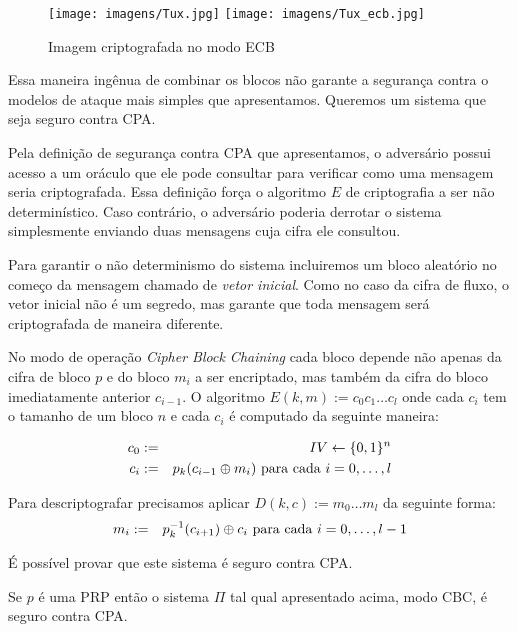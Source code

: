 \begin{figure}[!htp]
  \label{fig:ecb-exemplo}
  \centering
  \texttt{[image: imagens/Tux.jpg]}
  \texttt{[image: imagens/Tux\_ecb.jpg]}
  \caption{Imagem criptografada no modo ECB}
\end{figure}

Essa maneira ingênua de combinar os blocos não garante a segurança contra o modelos de ataque mais simples que apresentamos.
Queremos um sistema que seja seguro contra CPA.

Pela definição de segurança contra CPA que apresentamos, o adversário possui acesso a um oráculo que ele pode consultar para verificar como uma mensagem seria criptografada.
Essa definição força o algoritmo $E$ de criptografia a ser não determinístico.
Caso contrário, o adversário poderia derrotar o sistema simplesmente enviando duas mensagens cuja cifra ele consultou.

Para garantir o não determinismo do sistema incluiremos um bloco aleatório no começo da mensagem chamado de {\em vetor inicial}.
Como no caso da cifra de fluxo, o vetor inicial não é um segredo, mas garante que toda mensagem será criptografada de maneira diferente.

No modo de operação {\em Cipher Block Chaining} cada bloco depende não apenas da cifra de bloco $p$ e do bloco $m_i$ a ser encriptado, mas também da cifra do bloco imediatamente anterior $c_{i-1}$.
O algoritmo $E(k,m) := c_0 c_1 \dots c_l$ onde cada $c_i$ tem o tamanho de um bloco $n$ e cada $c_i$ é computado da seguinte maneira:

\begin{eqnarray*}
  c_0 & := & IV \leftarrow \{0,1\}^n \\
  c_i & := & p_k(c_{i-1} \oplus m_i) \textrm{ para cada } i = 0, \dots, l
\end{eqnarray*}

Para descriptografar precisamos aplicar $D(k,c) := m_0 \dots m_l$ da seguinte forma:
\begin{eqnarray*}
  m_{i} & := & p_k^{-1}(c_{i+1}) \oplus c_{i} \textrm{ para cada } i = 0, \dots, l-1
\end{eqnarray*}

É possível provar que este sistema é seguro contra CPA.

\begin{theorem}
  Se $p$ é uma PRP então o sistema $\Pi$ tal qual apresentado acima, modo CBC, é seguro contra CPA.
\end{theorem}

